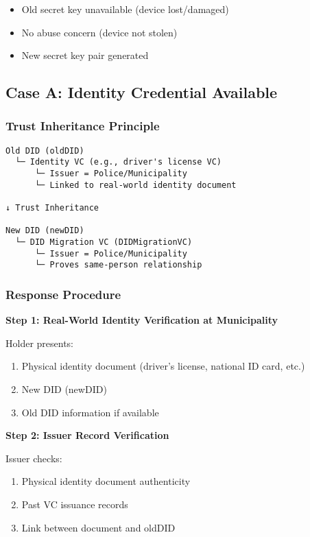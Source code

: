 \begin{itemize}
  \item Old secret key unavailable (device lost/damaged)
  \item No abuse concern (device not stolen)
  \item New secret key pair generated
\end{itemize}

\subsection{Case A: Identity Credential Available}

\subsubsection{Trust Inheritance Principle}

\begin{verbatim}
Old DID (oldDID)
  └─ Identity VC (e.g., driver's license VC)
      └─ Issuer = Police/Municipality
      └─ Linked to real-world identity document

↓ Trust Inheritance

New DID (newDID)
  └─ DID Migration VC (DIDMigrationVC)
      └─ Issuer = Police/Municipality
      └─ Proves same-person relationship
\end{verbatim}

\subsubsection{Response Procedure}

\textbf{Step 1: Real-World Identity Verification at Municipality}

Holder presents:
\begin{enumerate}
  \item Physical identity document (driver's license, national ID card, etc.)
  \item New DID (newDID)
  \item Old DID information if available
\end{enumerate}

\textbf{Step 2: Issuer Record Verification}

Issuer checks:
\begin{enumerate}
  \item Physical identity document authenticity
  \item Past VC issuance records
  \item Link between document and oldDID
\end{enumerate}

